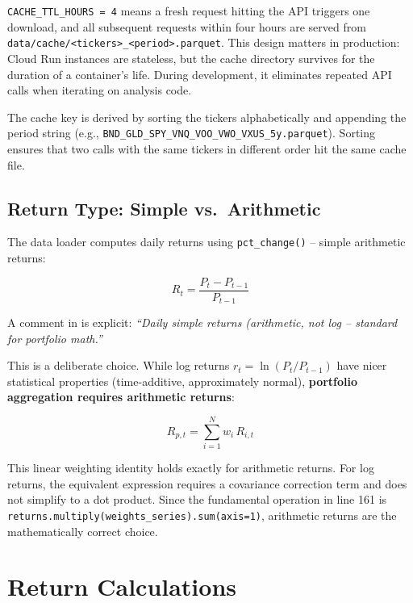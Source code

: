 \texttt{CACHE\_TTL\_HOURS = 4} means a fresh request hitting the API triggers one download, and all subsequent requests within four hours are served from \texttt{data/cache/<tickers>\_<period>.parquet}. This design matters in production: Cloud Run instances are stateless, but the cache directory survives for the duration of a container's life. During development, it eliminates repeated API calls when iterating on analysis code.

The cache key is derived by sorting the tickers alphabetically and appending the period string (e.g., \texttt{BND\_GLD\_SPY\_VNQ\_VOO\_VWO\_VXUS\_5y.parquet}). Sorting ensures that two calls with the same tickers in different order hit the same cache file.

\subsection{Return Type: Simple vs.\ Arithmetic}

The data loader computes daily returns using \texttt{pct\_change()} -- simple arithmetic returns:

\begin{equation}
  R_t = \frac{P_t - P_{t-1}}{P_{t-1}}
  \label{eq:simple-return}
\end{equation}

A comment in  is explicit: \textit{``Daily simple returns (arithmetic, not log -- standard for portfolio math.''}

This is a deliberate choice. While log returns $r_t = \ln(P_t / P_{t-1})$ have nicer statistical properties (time-additive, approximately normal), \textbf{portfolio aggregation requires arithmetic returns}:

\begin{equation}
  R_{p,t} = \sum_{i=1}^{N} w_i \, R_{i,t}
  \label{eq:weighted-return}
\end{equation}

This linear weighting identity holds exactly for arithmetic returns. For log returns, the equivalent expression requires a covariance correction term and does not simplify to a dot product. Since the fundamental operation in  line 161 is \texttt{returns.multiply(weights\_series).sum(axis=1)}, arithmetic returns are the mathematically correct choice.

\section{Return Calculations}
\label{sec:portfolio-returns}

